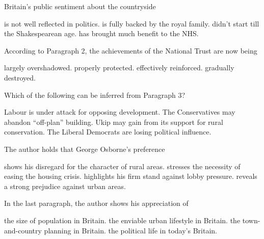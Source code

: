 \item Britain's public sentiment about the countryside
\begin{tasks}
	\task is not well reflected in politics.
	\task is fully backed by the royal family.
	\task didn't start till the Shakespearean age.
	\task has brought much benefit to the NHS.
\end{tasks}
\item According to Paragraph 2, the achievements of the National Trust are now being
\begin{tasks}
	\task largely overshadowed.
	\task properly protected.
	\task effectively reinforced.
	\task gradually destroyed.
\end{tasks}
\item Which of the following can be inferred from Paragraph 3?
\begin{tasks}
	\task Labour is under attack for opposing development.
	\task The Conservatives may abandon ``off-plan'' building.
	\task Ukip may gain from its support for rural conservation.
	\task The Liberal Democrats are losing political influence.
\end{tasks}
\item The author holds that George Osborne's preference
\begin{tasks}
	\task shows his disregard for the character of rural areas.
	\task stresses the necessity of easing the housing crisis.
	\task highlights his firm stand against lobby pressure.
	\task reveals a strong prejudice against urban areas.
\end{tasks}
\item In the last paragraph, the author shows his appreciation of
\begin{tasks}
	\task the size of population in Britain.
	\task the enviable urban lifestyle in Britain.
	\task the town-and-country planning in Britain.
	\task the political life in today's Britain.
\end{tasks}